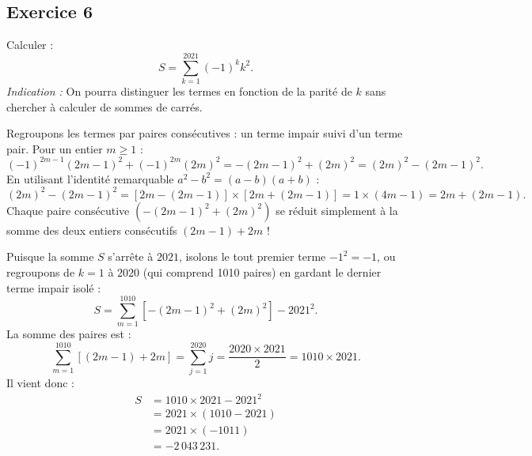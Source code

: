 \documentclass[11pt,a4paper]{article}
\begin{document}
\subsection*{Exercice 6}
Calculer :
\[
S = \sum_{k=1}^{2021} (-1)^k k^2.
\]
\textit{Indication :} On pourra distinguer les termes en fonction de la parité de $k$ sans chercher à calculer de sommes de carrés.

\begin{correctionbox}
Regroupons les termes par paires consécutives : un terme impair suivi d'un terme pair.
Pour un entier $m \ge 1$ :
\[
(-1)^{2m-1}(2m-1)^2 + (-1)^{2m}(2m)^2 = -(2m-1)^2 + (2m)^2 = (2m)^2 - (2m-1)^2.
\]
En utilisant l'identité remarquable $a^2 - b^2 = (a-b)(a+b)$ :
\[
(2m)^2 - (2m-1)^2 = \left[2m - (2m-1)\right] \times \left[2m + (2m-1)\right] = 1 \times (4m - 1) = 2m + (2m-1).
\]
Chaque paire consécutive $(-(2m-1)^2 + (2m)^2)$ se réduit simplement à la somme des deux entiers consécutifs $(2m-1) + 2m$ !

Puisque la somme $S$ s'arrête à $2021$, isolons le tout premier terme $-1^2 = -1$, ou regroupons de $k=1$ à $2020$ (qui comprend 1010 paires) en gardant le dernier terme impair isolé :
\[
S = \sum_{m=1}^{1010} \left[-(2m-1)^2 + (2m)^2\right] - 2021^2.
\]
La somme des paires est :
\[
\sum_{m=1}^{1010} \left[(2m-1) + 2m\right] = \sum_{j=1}^{2020} j = \frac{2020 \times 2021}{2} = 1010 \times 2021.
\]
Il vient donc :
\begin{align*}
S &= 1010 \times 2021 - 2021^2 \\
&= 2021 \times (1010 - 2021) \\
&= 2021 \times (-1011) \\
&= -2\,043\,231.
\end{align*}
\end{correctionbox}
\end{document}
